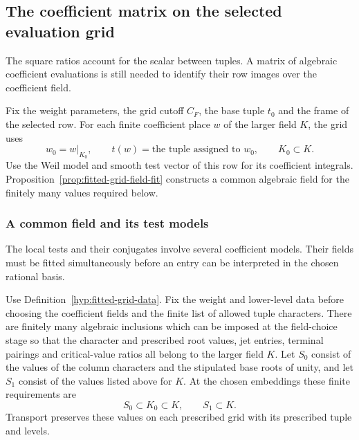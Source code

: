 \subsection{The coefficient matrix on the selected evaluation grid}
\label{subsec:fitted-evaluation}

The square ratios account for the scalar between tuples. A matrix of algebraic coefficient evaluations is still needed to identify their row images over the coefficient field.

\begin{paramdefinition}\label{hyp:fitted-grid-data}
Fix the weight parameters, the grid cutoff \(C_F\), the base tuple
\(t_0\) and the frame of the selected row. For each finite coefficient
place \(w\) of the larger field \(K\), the grid uses
\[
     w_0=w|_{K_0},\qquad t(w)=\text{the tuple assigned to }w_0 ,
       \qquad K_0\subset K .
\]
Use the Weil model and smooth test vector of this row for its coefficient
integrals. Proposition~\ref{prop:fitted-grid-field-fit} constructs
a common algebraic field for the finitely many values required below.
\end{paramdefinition}

\subsubsection{A common field and its test models}

The local tests and their conjugates involve several coefficient models. Their fields must be fitted simultaneously before an entry can be interpreted in the chosen rational basis.

\begin{proposition}\label{prop:fitted-grid-field-fit}
Use Definition~\ref{hyp:fitted-grid-data}. Fix the weight
and lower-level data before choosing the coefficient fields
and the finite list of allowed tuple characters.
There are finitely many algebraic inclusions which can be imposed
at the field-choice stage so that the character and prescribed
root values, jet entries, terminal pairings and critical-value
ratios all belong to the larger field \(K\). Let \(S_0\) consist of the values of the column characters and the stipulated base roots of unity, and let \(S_1\) consist of the values listed above for \(K\). At the chosen embeddings these finite requirements are
\[
 S_0\subset K_0\subset K,\qquad S_1\subset K.
\]
 Transport preserves these values on each prescribed grid
with its prescribed tuple and levels.
\end{proposition}

